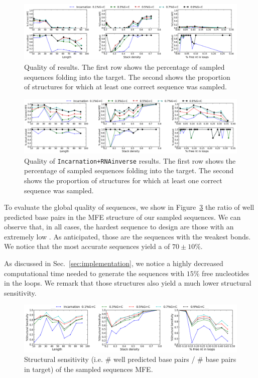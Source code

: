 \begin{figure}[ht!]	
	\centering
	\includegraphics[width=\textwidth]{Figures/mfe_struct_solve_nornainverse.png}
	\caption{Quality of \ourprog results. The first row shows the percentage
	of sampled sequences folding into the target. The second shows the 	
	proportion	of structures for which at least one correct sequence was 
	sampled.}
	\label{fig:mfe_struct_solved_noinverse}	
\end{figure}



\begin{figure}[ht!]	
	\centering
	\includegraphics[width=\textwidth]{Figures/mfe_struct_solved}
	\caption{Quality of \texttt{Incarnation+RNAinverse} results. The first row shows the percentage
	of sampled sequences folding into the target. The second shows the 	
	proportion	of structures for which at least one correct sequence was 
	sampled.}
	\label{fig:mfe_struct_solved}	
\end{figure}
 
To evaluate the global quality of \ourprog sequences, we show
in Figure~\ref{fig:ss_sens} the ratio of well predicted base pairs in the
MFE structure of our sampled sequences. We can observe that, in all cases,
the hardest sequence to design are those with an extremely low \GCContent. As anticipated, those are the sequences with the weakest bonds.
We notice that the most accurate sequences yield a \GCContent
of $70\pm 10\%$. 

As discussed in Sec.~\ref{sec:implementation}, we notice a highly decreased
computational time needed to generate the sequences with $15\%$ free 
nucleotides in the loops. We remark that those structures also yield 
a much lower structural sensitivity.

\begin{figure}[ht!]
 	\centering
	\includegraphics[scale=0.45]{Figures/rnastrand_clustered_rnainverse_100samples_struct_sens.png}
	\caption{Structural sensitivity (i.e. $\#$ well predicted base pairs / $\#$ base pairs in target) of the sampled sequences MFE. }
	\label{fig:ss_sens}	
\end{figure}


